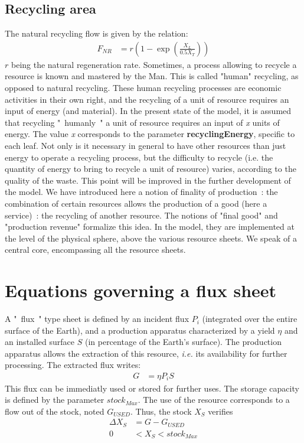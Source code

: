 \documentclass[12pt,a4paper]{article}%
\begin{document}
\begin{appendix}
\subsection{Recycling area}
The natural recycling flow is given by the relation: 
\begin{align}
	F_{NR} &= r\left( 1-\exp\left( \frac{X_{L}}{0.5X_{T}}\right) \right )
\end{align}
$r$ being the natural regeneration rate.  Sometimes, a process allowing to recycle a resource is known and mastered by the Man. This is called "human" recycling, as opposed to natural recycling. These human recycling processes are economic activities in their own right, and the recycling of a unit of resource requires an input of energy (and material). In the present state of the model, it is assumed that recycling "~humanly~" a unit of resource requires an input of \textit{x} units of energy. The value \textit{x} corresponds to the parameter \textbf{recyclingEnergy}, specific to each leaf. Not only is it necessary in general to have other resources than just energy to operate a recycling process, but the difficulty to recycle (i.e. the quantity of energy to bring to recycle a unit of resource) varies, according to the quality of the waste. This point will be improved in the further development of the model. We have introduced here a notion of finality of production~: the combination of certain resources allows the production of a good (here a service)~: the recycling of another resource. The notions of "final good" and "production revenue" formalize this idea. In the model, they are implemented at the level of the physical sphere, above the various resource sheets. We speak of a central core, encompassing all the resource sheets.  

\section{Equations governing a flux sheet}
 A "~flux~" type sheet is defined by an incident flux $P_{i}$ (integrated over the entire surface of the Earth), and a production apparatus characterized by a yield $\eta$ and an installed surface $S$ (in percentage of the Earth's surface). The production apparatus allows the extraction of this resource, \textit{ i.e.} its availability for further processing.  The extracted flux writes:
 \begin{align}
 	G &=\eta P_i S
 \end{align}
 This flux can be immediatly used or stored for further uses. The storage capacity is defined by the parameter $stock_{Max}$.  The use of the resource corresponds to a flow out of the stock, noted $G_{USED}$.  Thus, the stock $X_{S}$ verifies 
 \begin{align}
	 \Delta X_{S} 		& = G - G_{USED} \\
	   				0 & <X_{S}<stock_{Max}	
 \end{align}   


\end{appendix}
\end{document}
